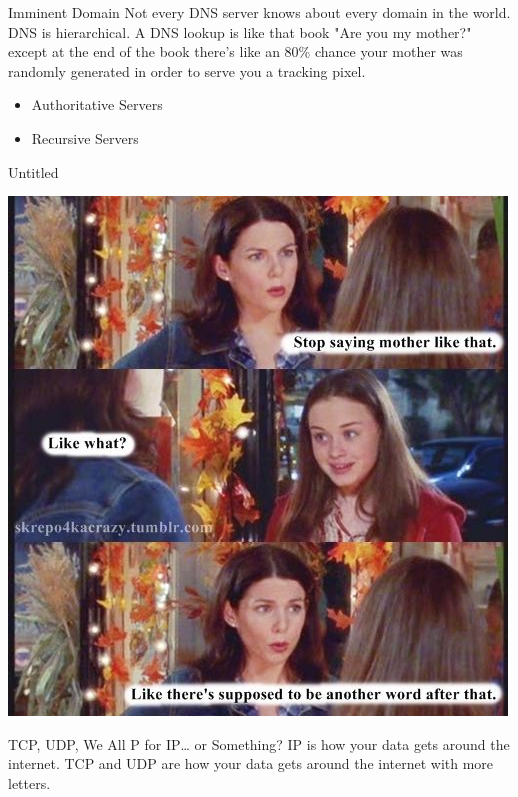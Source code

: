 \documentclass[presentation]{beamer}
\begin{document}
\begin{frame}[label={sec:org2be301a}]{Imminent Domain}
Not every DNS server knows about every domain in the world.  DNS is
hierarchical. A DNS lookup is like that book "Are you my mother?"
except at the end of the book there's like an 80\% chance your mother
was randomly generated in order to serve you a tracking pixel.

\pause
\begin{itemize}
\item Authoritative Servers
\item Recursive Servers
\end{itemize}
\end{frame}

\begin{frame}[label={sec:org3b30494}]{Untitled}
\begin{center}
\includegraphics[height=0.8\textheight]{./gg.jpg}
\end{center}
\end{frame}

\begin{frame}[label={sec:org971ddb3}]{TCP, UDP, We All P for IP\ldots{} or Something?}
IP is how your data gets around the internet. TCP and UDP are how your
data gets around the internet with more letters.
\end{frame}
\end{document}
